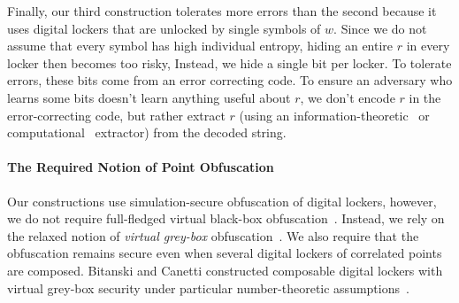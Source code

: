 \documentclass[11pt]{article}
\newcommand{\authnote}[2]{{\textcolor{red}{\textsf{#1 notes: }\textcolor{blue}{ #2}}\marginpar{\textcolor{red}{\textbf{!!!!!}}}}}
\newcommand{\authnote}[2]{}
\newcommand{\bnote}[1]{{\authnote{Ben}{#1}}}
\newcommand{\lnote}[1]{{\authnote{Leo}{#1}}}
\begin{document}
Finally, our third construction tolerates more errors than the second because it uses digital lockers that are unlocked by single symbols of $w$. Since we do not assume that every symbol has high individual entropy, hiding an entire $r$ in every locker then becomes too risky, Instead, we hide a single bit per locker. To tolerate errors, these bits come from an error correcting code. To ensure an  adversary who learns some bits doesn't learn anything useful about $r$, we don't encode $r$ in the error-correcting code, but rather extract $r$ (using an information-theoretic~\cite{nisan1993randomness} or computational~\cite{krawczyk2010cryptographic} extractor) from the decoded string.



\paragraph{The Required Notion of Point Obfuscation} 
Our constructions use simulation-secure  obfuscation of digital lockers, however, we do not require full-fledged virtual black-box obfuscation~\cite{barak2001possibility}. Instead, we rely on the relaxed notion of \emph{virtual grey-box} obfuscation~\cite{bitansky2010strong}. We also require that the obfuscation remains secure even when several digital lockers of correlated points are composed.
Bitanski and Canetti constructed composable digital lockers with virtual grey-box security under particular number-theoretic assumptions~\cite{bitansky2010strong}.
\end{document}
